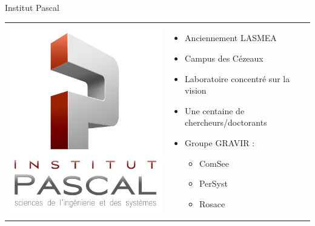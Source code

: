 \documentclass{beamer}
\begin{document}
\begin{frame}{Institut Pascal}
  \begin{tabular}{l l}
    \begin{minipage}{0.3\linewidth}
      \includegraphics[width=\linewidth]{images/logo-IP.jpg}
    \end{minipage}
    &
    \begin{minipage}{0.7\linewidth}
      \begin{itemize}
      \item Anciennement LASMEA
      \item Campus des Cézeaux
      \item Laboratoire concentré sur la vision
      \item Une centaine de chercheurs/doctorants
      \item Groupe GRAVIR \pause: %
      \begin{itemize}
        \item ComSee %
        \item PerSyst %
        \item Rosace %
        \end{itemize}  
      \end{itemize}
    \end{minipage}
  \end{tabular}
\end{frame}
\end{document}
